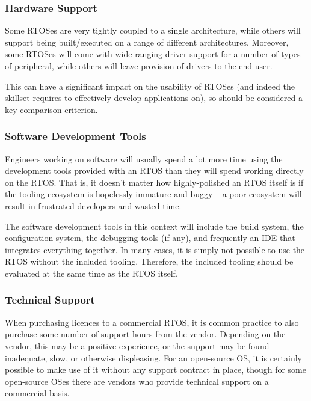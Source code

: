 \subsubsection{Hardware Support}

Some RTOSes are very tightly coupled to a single architecture, while others will support being built/executed on a range of different architectures. Moreover, some RTOSes will come with wide-ranging driver support for a number of types of peripheral, while others will leave provision of drivers to the end user.

This can have a significant impact on the usability of RTOSes (and indeed the skillset requires to effectively develop applications on), so should be considered a key comparison criterion.

\subsubsection{Software Development Tools}

Engineers working on software will usually spend a lot more time using the development tools provided with an RTOS than they will spend working directly on the RTOS. That is, it doesn't matter how highly-polished an RTOS itself is if the tooling ecosystem is hopelessly immature and buggy -- a poor ecosystem will result in frustrated developers and wasted time.

The software development tools in this context will include the build system, the configuration system, the debugging tools (if any), and frequently an IDE that integrates everything together. In many cases, it is simply not possible to use the RTOS without the included tooling. Therefore, the included tooling should be evaluated at the same time as the RTOS itself.

\subsubsection{Technical Support}

When purchasing licences to a commercial RTOS, it is common practice to also purchase some number of support hours from the vendor. Depending on the vendor, this may be a positive experience, or the support may be found inadequate, slow, or otherwise displeasing. For an open-source OS, it is certainly possible to make use of it without any support contract in place, though for some open-source OSes there are vendors who provide technical support on a commercial basis.

